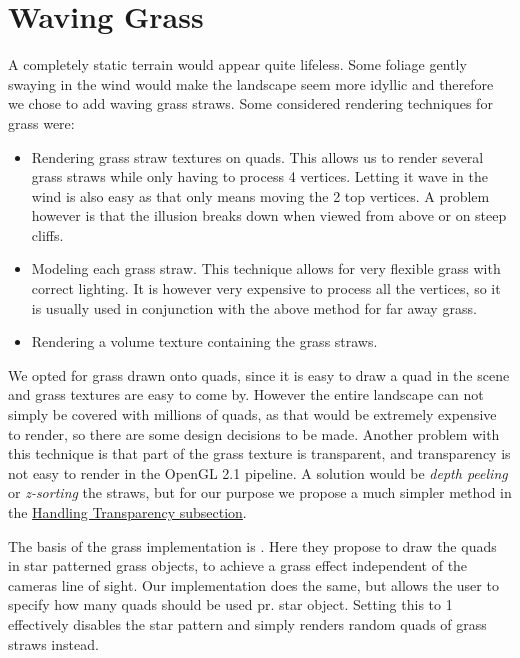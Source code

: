 \chapter{Waving Grass}


A completely static terrain would appear quite lifeless. Some foliage
gently swaying in the wind would make the landscape seem more idyllic
and therefore we chose to add waving grass straws. Some considered
rendering techniques for grass were:

\begin{itemize}
\item Rendering grass straw textures on quads. This allows us to
  render several grass straws while only having to process 4
  vertices. Letting it wave in the wind is also easy as that only
  means moving the 2 top vertices. A problem however is that the
  illusion breaks down when viewed from above or on steep cliffs.
\item Modeling each grass straw. This technique allows for very
  flexible grass with correct lighting. It is however very expensive
  to process all the vertices, so it is usually used in conjunction
  with the above method for far away grass.
\item Rendering a volume texture containing the grass straws.
\end{itemize}

We opted for grass drawn onto quads, since it is easy to draw a quad
in the scene and grass textures are easy to come by. However the
entire landscape can not simply be covered with millions of quads, as
that would be extremely expensive to render, so there are some design
decisions to be made. Another problem with this technique is that part
of the grass texture is transparent, and transparency is not easy to
render in the OpenGL 2.1 pipeline. A solution would be \emph{depth
  peeling} or \emph{z-sorting} the straws, but for our purpose we
propose a much simpler method in the
\hyperref[sec:transparency]{Handling Transparency subsection}.

The basis of the grass implementation is
. Here they propose to draw the quads in
star patterned grass objects, to achieve a grass effect independent of
the cameras line of sight. Our implementation does the same, but
allows the user to specify how many quads should be used pr. star
object. Setting this to 1 effectively disables the star pattern and
simply renders random quads of grass straws instead.

